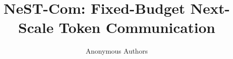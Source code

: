\documentclass[12pt,journal,draftclsnofoot,onecolumn,letterpaper]{IEEEtran}
\begin{document}
\title{NeST-Com: Fixed-Budget Next-Scale Token Communication}
\author{Anonymous Authors}
\maketitle






\end{document}
